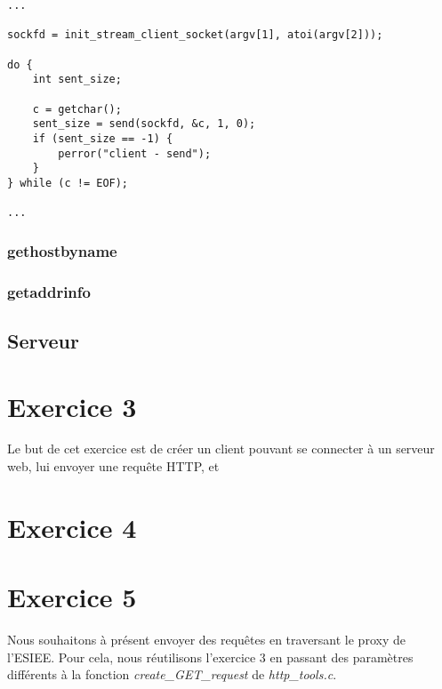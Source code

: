 \documentclass[a4paper, frenchb, 11pt]{article}
\begin{document}
\begin{lstlisting}
...

sockfd = init_stream_client_socket(argv[1], atoi(argv[2]));

do {
    int sent_size;

    c = getchar();
    sent_size = send(sockfd, &c, 1, 0);
    if (sent_size == -1) {
        perror("client - send");
    }
} while (c != EOF);

...
\end{lstlisting}

\subsubsection{gethostbyname}

\subsubsection{getaddrinfo}

\subsection{Serveur}

\newpage

\section{Exercice 3}
Le but de cet exercice est de créer un client pouvant se connecter à un serveur web, lui envoyer une requête HTTP, et %
\newpage

\section{Exercice 4}

\newpage

\section{Exercice 5}
Nous souhaitons à présent envoyer des requêtes en traversant le proxy de l'ESIEE. Pour cela, nous réutilisons l'exercice 3 en passant des paramètres différents à la fonction \emph{create\_GET\_request} de \emph{http\_tools.c}.\\
\end{document}
